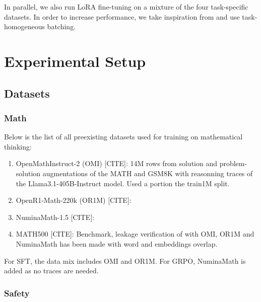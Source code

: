 \documentclass[11pt]{article}
\begin{document}
In parallel, we also run LoRA fine-tuning on a mixture of the four task-specific datasets. In order to increase performance, we take inspiration from \citeauthor{rao-etal-2024-commonit} and use task-homogeneous batching.

\section{Experimental Setup}


\subsection{Datasets}

\subsubsection{Math}

    Below is the list of all preexisting datasets used for training on mathematical thinking:

    \begin{enumerate}
        \item OpenMathInstruct-2 (OMI) [CITE]: 14M rows from solution and problem-solution augmentations of the MATH and GSM8K with reasonning traces of the Llama3.1-405B-Instruct model. Used a portion the train1M split.
        \item OpenR1-Math-220k (OR1M) [CITE]: 
        \item NuminaMath-1.5 [CITE]:
        \item MATH500 [CITE]: Benchmark, leakage verification of with OMI, OR1M and NuminaMath has been made with word and embeddings overlap. 
    \end{enumerate}
    
    For SFT, the data mix includes OMI and OR1M. For GRPO, NuminaMath is added as no traces are needed.

\subsubsection{Safety}
\end{document}

